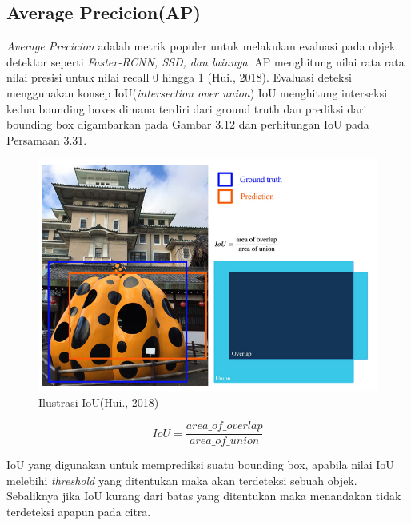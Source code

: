 \subsection{Average Precicion(AP)}
\emph{Average Precicion} adalah metrik populer untuk melakukan evaluasi pada objek detektor seperti \emph{Faster-RCNN, SSD, dan lainnya}. AP menghitung nilai rata rata nilai presisi untuk nilai recall 0 hingga 1 (Hui., 2018). Evaluasi deteksi menggunakan konsep IoU(\emph{intersection over union})
IoU menghitung interseksi kedua bounding boxes dimana terdiri dari ground truth dan prediksi dari bounding box digambarkan pada Gambar 3.12 dan perhitungan IoU pada Persamaan 3.31.
\begin{figure}[H]
	\centering
	\includegraphics[width=0.7\linewidth]{iou}
	\caption{Ilustrasi IoU(Hui., 2018)}
	\label{fig:iou}
\end{figure}
\begin{equation}
	IoU=\frac{area\_of\_overlap}{area\_of\_union}
\end{equation}

IoU yang digunakan untuk memprediksi suatu bounding box, apabila nilai IoU melebihi \emph{threshold} yang ditentukan maka akan terdeteksi sebuah objek.
Sebaliknya jika IoU kurang dari batas yang ditentukan maka menandakan tidak terdeteksi apapun pada citra. 

